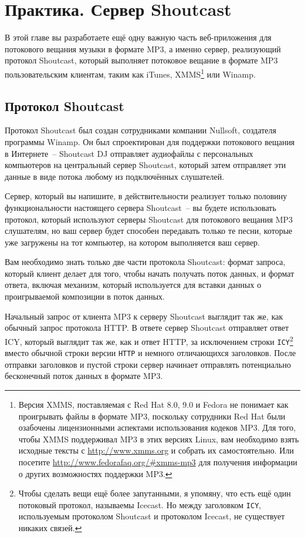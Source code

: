 \chapter{Практика. Сервер Shoutcast}
\label{ch:28}

\thispagestyle{empty}

В этой главе вы разработаете ещё одну важную часть веб-приложения для потокового вещания
музыки в формате MP3, а именно сервер, реализующий протокол Shoutcast, который
выполняет потоковое вещание в формате MP3 пользовательским клиентам, таким как iTunes,
XMMS\footnote{Версия XMMS, поставляемая с Red Hat 8.0, 9.0 и Fedora не понимает как
  проигрывать файлы в формате MP3, поскольку сотрудники Red Hat были озабочены
  лицензионными аспектами использования кодеков MP3.  Для того, чтобы XMMS поддерживал MP3
  в этих версиях Linux, вам необходимо взять исходные тексты с \url{http://www.xmms.org} и
  собрать их самостоятельно.  Или посетите \url{http://www.fedorafaq.org/#xmms-mp3} для
  получения информации о других возможностях поддержки MP3.} или Winamp.

\section{Протокол Shoutcast}

Протокол Shoutcast был создан сотрудниками компании Nullsoft, создателя программы
Winamp. Он был спроектирован для поддержки потокового вещания в Интернете~-- Shoutcast DJ
отправляет аудиофайлы с персональных компьютеров на центральный сервер Shoutcast, который
затем отправляет эти данные в виде потока любому из подключённых слушателей.

Сервер, который вы напишите, в действительности реализует только половину функциональности
настоящего сервера Shoutcast~-- вы будете использовать протокол, который используют
серверы Shoutcast для потокового вещания MP3 слушателям, но ваш сервер будет способен
передавать только те песни, которые уже загружены на тот компьютер, на котором выполняется
ваш сервер.

Вам необходимо знать только две части протокола Shoutcast: формат запроса, который клиент
делает для того, чтобы начать получать поток данных, и формат ответа, включая механизм,
который используется для вставки данных о проигрываемой композиции в поток данных.

Начальный запрос от клиента MP3 к серверу Shoutcast выглядит так же, как обычный запрос
протокола HTTP.  В ответе сервер Shoutcast отправляет ответ ICY, который выглядит так же,
как и ответ HTTP, за исключением строки \lstinline{ICY}\footnote{Чтобы сделать вещи ещё более
  запутанными, я упомяну, что есть ещё один потоковый протокол, называемы Icecast. Но
  между заголовком \lstinline{ICY}, используемым протоколом Shoutcast и протоколом Icecast, не
  существует никаких связей.} вместо обычной строки версии \lstinline{HTTP} и немного
отличающихся заголовков. После отправки заголовков и пустой строки сервер начинает
отправлять потенциально бесконечный поток данных в формате MP3.

